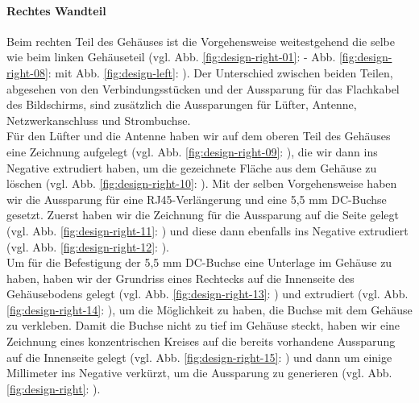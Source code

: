 \paragraph{Rechtes Wandteil}
Beim rechten Teil des Gehäuses ist die Vorgehensweise weitestgehend die selbe wie beim linken Gehäuseteil (vgl. Abb. \ref{fig:design-right-01}:  - Abb. \ref{fig:design-right-08}:  mit Abb. \ref{fig:design-left}: ). 
Der Unterschied zwischen beiden Teilen, abgesehen von den Verbindungsstücken und der Aussparung für das Flachkabel des Bildschirms, sind zusätzlich die Aussparungen für Lüfter, Antenne, Netzwerkanschluss und Strombuchse. \\
\noindent Für den Lüfter und die Antenne haben wir auf dem oberen Teil des Gehäuses eine Zeichnung aufgelegt (vgl. Abb. \ref{fig:design-right-09}: ), die  wir dann ins Negative extrudiert haben, um die gezeichnete Fläche aus dem Gehäuse zu löschen (vgl. Abb. \ref{fig:design-right-10}: ). 
Mit der selben Vorgehensweise haben wir die Aussparung für eine RJ45-Verlängerung und eine 5,5 mm DC-Buchse gesetzt. 
Zuerst haben wir die Zeichnung für die Aussparung auf die Seite gelegt (vgl. Abb.  \ref{fig:design-right-11}: ) und diese dann ebenfalls ins Negative extrudiert (vgl. Abb. \ref{fig:design-right-12}: ). \\
\noindent Um für die Befestigung der 5,5 mm DC-Buchse eine Unterlage im Gehäuse zu haben, haben wir der Grundriss eines Rechtecks auf die Innenseite des Gehäusebodens gelegt (vgl. Abb.  \ref{fig:design-right-13}: ) und extrudiert (vgl. Abb. \ref{fig:design-right-14}: ), um die Möglichkeit zu haben, die Buchse mit dem Gehäuse zu verkleben. 
Damit die Buchse nicht zu tief im Gehäuse steckt, haben wir eine Zeichnung eines konzentrischen Kreises auf die bereits vorhandene Aussparung auf die Innenseite gelegt  (vgl. Abb.  \ref{fig:design-right-15}: ) und dann um einige Millimeter ins Negative verkürzt, um die Aussparung zu generieren (vgl. Abb. \ref{fig:design-right}: ).\par
